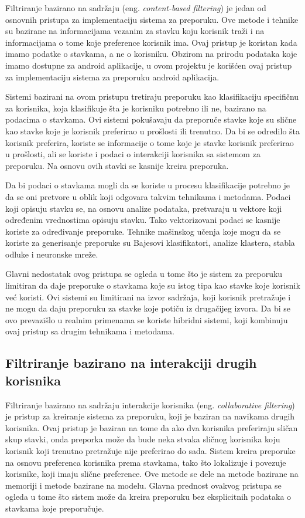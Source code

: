 \documentclass[a4paper,12pt,titlepage]{article}
\begin{document}
Filtriranje bazirano na sadržaju (eng. \emph{content-based filtering}) je jedan od osnovnih pristupa za implementaciju sistema za preporuku. Ove metode i tehnike su bazirane na informacijama vezanim za stavku koju korisnik traži i na informacijama o tome koje preference korisnik ima. Ovaj pristup je koristan kada imamo podatke o stavkama, a ne o korisniku. Obzirom na prirodu podataka koje imamo dostupne za android aplikacije, u ovom projektu je korišćen ovaj pristup za implementaciju sistema za preporuku android aplikacija. 

Sistemi bazirani na ovom pristupu tretiraju preporuku kao klasifikaciju specifičnu za korisnika, koja klasifikuje šta je korisniku potrebno ili ne, bazirano na podacima o stavkama. Ovi sistemi pokušavaju da preporuče stavke koje su slične kao stavke koje je korisnik preferirao u prošlosti ili trenutno. Da bi se odredilo šta korisnik preferira, koriste se informacije o tome koje je stavke korisnik preferirao u prošlosti, ali se koriste i podaci o interakciji korisnika sa sistemom za preporuku. Na osnovu ovih stavki se kasnije kreira preporuka. 

Da bi podaci o stavkama mogli da se koriste u procesu klasifikacije potrebno je da se oni pretvore u oblik koji odgovara takvim tehnikama i metodama. Podaci koji opisuju stavku se, na osnovu analize podataka, pretvaraju u vektore koji određenim vrednostima opisuju stavku. Tako vektorizovani podaci se kasnije koriste za određivanje preporuke. Tehnike mašinskog učenja koje mogu da se koriste za generisanje preporuke su Bajesovi klasifikatori, analize klastera, stabla odluke i neuronske mreže.

Glavni nedostatak ovog pristupa se ogleda u tome što je sistem za preporuku limitiran da daje preporuke o stavkama koje su istog tipa kao stavke koje korisnik već koristi. Ovi sistemi su limitirani na izvor sadržaja, koji korisnik pretražuje i ne mogu da daju preporuku za  stavke koje potiču iz drugačijeg izvora. Da bi se ovo prevazišlo u realnim primenama se koriste hibridni sistemi, koji kombinuju ovaj pristup sa drugim tehnikama i metodama.


\subsection{Filtriranje bazirano na interakciji drugih korisnika}

Filtriranje bazirano na sadržaju interakcije korisnika (eng. \emph{collaborative filtering}) je pristup za kreiranje sistema za preporuku, koji je baziran na navikama drugih korisnika. Ovaj pristup je baziran na tome da ako dva korisnika preferiraju sličan skup stavki, onda preporka može da bude neka stvaka sličnog korisnika koju korisnik koji trenutno pretražuje nije preferirao do sada. Sistem kreira preporuke na osnovu preferenca korisnika prema stavkama, tako što lokalizuje i povezuje korisnike, koji imaju slične preference. Ove metode se dele na metode bazirane na memoriji i metode bazirane na modelu. Glavna prednost ovakvog pristupa se ogleda u tome što sistem može da kreira preporuku bez eksplicitnih podataka o stavkama koje preporučuje. 
\end{document}
